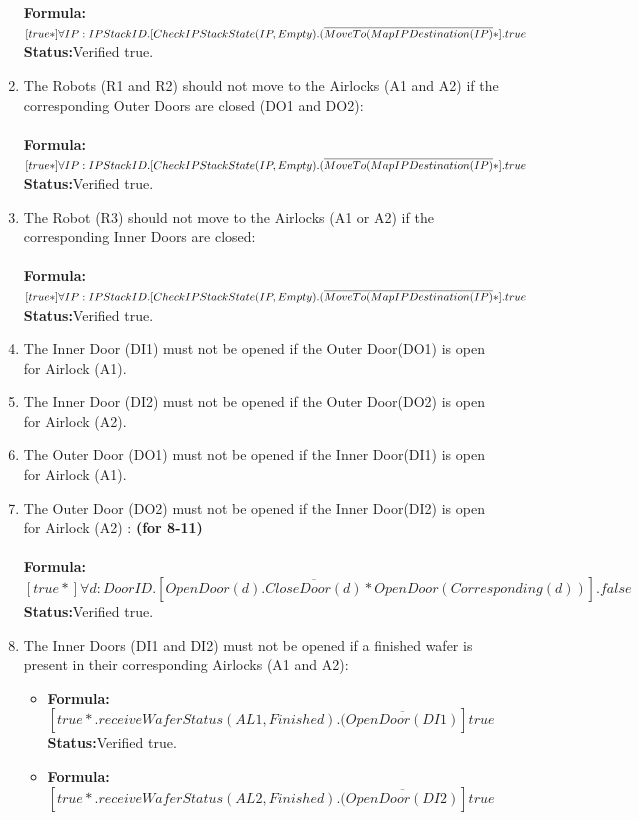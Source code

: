 \documentclass[a4paper,12pt]{article}
\begin{document}
\begin{enumerate}
\\
\\\textbf{Formula:} $[true*] \forall IP: IPStackID.[CheckIPStackState(IP, Empty).
\\(\overline{MoveTo(MapIPDestination(IP)}*].true$ \\\textbf{Status:}Verified true.
\item The Robots (R1 and R2) should not move to the Airlocks (A1 and A2) if the corresponding Outer Doors are closed (DO1 and DO2):
\\
\\\textbf{Formula:} $[true*] \forall IP: IPStackID.[CheckIPStackState(IP, Empty).
\\(\overline{MoveTo(MapIPDestination(IP)}*].true$ \\\textbf{Status:}Verified true.
\item The Robot (R3) should not move to the Airlocks (A1 or A2) if the corresponding Inner Doors are closed:
\\
\\\textbf{Formula:} $[true*] \forall IP: IPStackID.[CheckIPStackState(IP, Empty).
\\(\overline{MoveTo(MapIPDestination(IP)}*].true$ \\\textbf{Status:}Verified true.
\item The Inner Door (DI1) must not be opened if the Outer Door(DO1) is open for Airlock (A1).
\item The Inner Door (DI2) must not be opened if the Outer Door(DO2) is open for Airlock (A2).
\item The Outer Door (DO1) must not be opened if the Inner Door(DI1) is open for Airlock (A1).
\item The Outer Door (DO2) must not be opened if the Inner Door(DI2) is open for Airlock (A2) : \textbf{(for 8-11)} 
\\
\\\textbf{Formula:} $[true*] \forall d: DoorID.[OpenDoor(d).\overline{CloseDoor(d)}*OpenDoor(Corresponding(d))].false$ \\\textbf{Status:}Verified true.
\item The Inner Doors (DI1 and DI2) must not be opened if a finished wafer is present in their corresponding Airlocks (A1 and A2):
    \begin{itemize}
	\item \textbf{Formula:} $[true*.receiveWaferStatus(AL1,Finished).(\overline{OpenDoor(DI1)}]true$ 
	\\\textbf{Status:}Verified true.
    \item \textbf{Formula:} $[true*.receiveWaferStatus(AL2,Finished).(\overline{OpenDoor(DI2)}]true$  

\end{itemize}
\end{enumerate}
\end{document}
